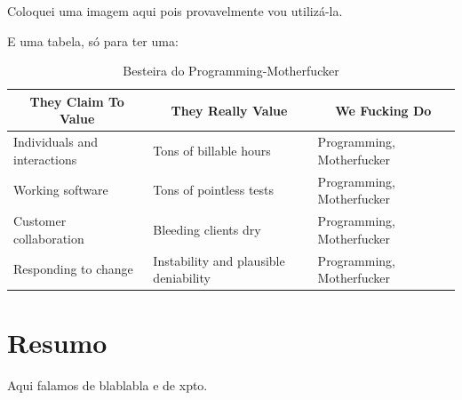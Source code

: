 Coloquei uma imagem aqui pois provavelmente vou utilizá-la.

E uma tabela, só para ter uma:

\begin{table}[]
\centering
\begin{tabular}{lll}
\multicolumn{1}{c}{\textbf{They Claim To Value}}   & \multicolumn{1}{c}{\textbf{They Really Value}}             & \multicolumn{1}{c}{\textbf{We Fucking Do}}     \\ \hline
\multicolumn{1}{|l|}{Individuals and interactions} & \multicolumn{1}{l|}{Tons of billable hours}                & \multicolumn{1}{l|}{Programming, Motherfucker} \\ \hline
\multicolumn{1}{|l|}{Working software}             & \multicolumn{1}{l|}{Tons of pointless tests}               & \multicolumn{1}{l|}{Programming, Motherfucker} \\ \hline
\multicolumn{1}{|l|}{Customer collaboration}       & \multicolumn{1}{l|}{Bleeding clients dry}                  & \multicolumn{1}{l|}{Programming, Motherfucker} \\ \hline
\multicolumn{1}{|l|}{Responding to change}         & \multicolumn{1}{l|}{Instability and plausible deniability} & \multicolumn{1}{l|}{Programming, Motherfucker} \\ \hline
\end{tabular}
\caption{Besteira do Programming-Motherfucker}
\label{label-da-tabela}
\end{table}



\section*{Resumo}
Aqui falamos de blablabla e de xpto.